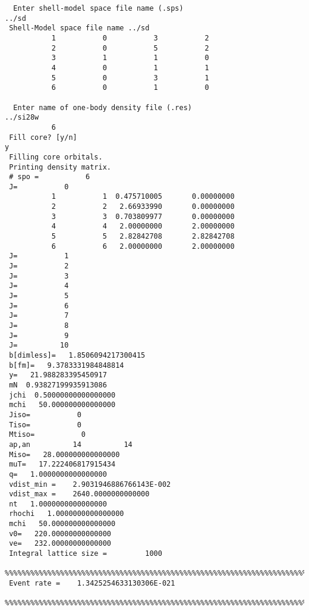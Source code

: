 \documentclass[11pt]{amsart}
\begin{document}
\begin{verbatim}
  Enter shell-model space file name (.sps)
../sd
 Shell-Model space file name ../sd          
           1           0           3           2
           2           0           5           2
           3           1           1           0
           4           0           1           1
           5           0           3           1
           6           0           1           0
  
  Enter name of one-body density file (.res) 
../si28w
           6
 Fill core? [y/n]
y
 Filling core orbitals.
 Printing density matrix.
 # spo =           6
 J=           0
           1           1  0.475710005       0.00000000    
           2           2   2.66933990       0.00000000    
           3           3  0.703809977       0.00000000    
           4           4   2.00000000       2.00000000    
           5           5   2.82842708       2.82842708    
           6           6   2.00000000       2.00000000    
 J=           1
 J=           2
 J=           3
 J=           4
 J=           5
 J=           6
 J=           7
 J=           8
 J=           9
 J=          10
 b[dimless]=   1.8506094217300415     
 b[fm]=   9.3783331984848814     
 y=   21.988283395450917     
 mN  0.93827199935913086     
 jchi  0.50000000000000000     
 mchi   50.000000000000000     
 Jiso=           0
 Tiso=           0
 Mtiso=           0
 ap,an          14          14
 Miso=   28.000000000000000     
 muT=   17.222406817915434     
 q=   1.0000000000000000     
 vdist_min =    2.9031946886766143E-002
 vdist_max =    2640.0000000000000     
 nt   1.0000000000000000     
 rhochi   1.0000000000000000     
 mchi   50.000000000000000     
 v0=   220.00000000000000     
 ve=   232.00000000000000     
 Integral lattice size =         1000
 %%%%%%%%%%%%%%%%%%%%%%%%%%%%%%%%%%%%%%%%%%%%%%%%%%%%%%%%%%%%%%%%%%%%%%%%%%%%%%%
 Event rate =    1.3425254633130306E-021
 %%%%%%%%%%%%%%%%%%%%%%%%%%%%%%%%%%%%%%%%%%%%%%%%%%%%%%%%%%%%%%%%%%%%%%%%%%%%%%%
\end{verbatim}
\end{document}
